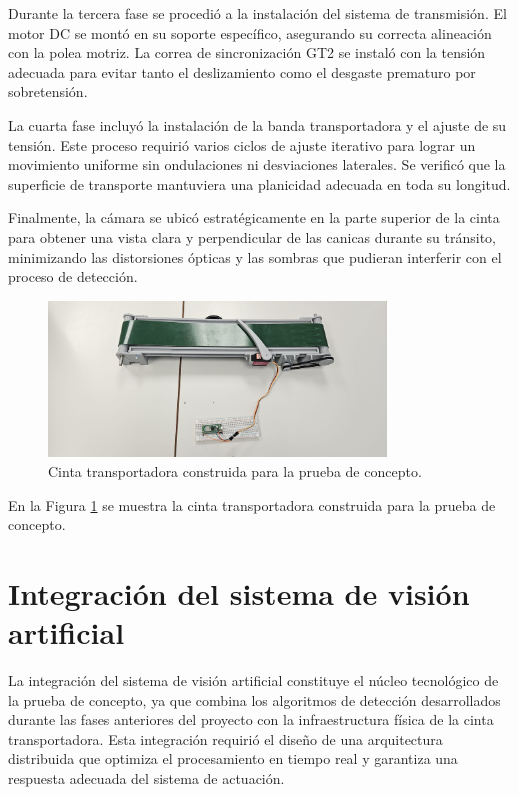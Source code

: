 \documentclass[11pt,spanish,listoffigures,listoftables]{tfgetsinf}
\begin{document}
Durante la tercera fase se procedió a la instalación del sistema de transmisión. El motor DC se montó en su soporte específico, asegurando su correcta alineación con la polea motriz. La correa de sincronización GT2 se instaló con la tensión adecuada para evitar tanto el deslizamiento como el desgaste prematuro por sobretensión.

La cuarta fase incluyó la instalación de la banda transportadora y el ajuste de su tensión. Este proceso requirió varios ciclos de ajuste iterativo para lograr un movimiento uniforme sin ondulaciones ni desviaciones laterales. Se verificó que la superficie de transporte mantuviera una planicidad adecuada en toda su longitud.

Finalmente, la cámara se ubicó estratégicamente en la parte superior de la cinta para obtener una vista clara y perpendicular de las canicas durante su tránsito, minimizando las distorsiones ópticas y las sombras que pudieran interferir con el proceso de detección.

\begin{figure}[H]
   \centering
   \includegraphics[width=0.8\textwidth]{images/prueba_de_concepto/cinta_transportadora_construccion.jpeg}
   \caption[Cinta transportadora construida para la prueba de concepto]{Cinta transportadora construida para la prueba de concepto.}
   \label{fig:cinta_transportadora}
\end{figure}

En la Figura \ref{fig:cinta_transportadora} se muestra la cinta transportadora construida para la prueba de concepto.

\section{Integración del sistema de visión artificial} \label{sec:integracion_vision}
La integración del sistema de visión artificial constituye el núcleo tecnológico de la prueba de concepto, ya que combina los algoritmos de detección desarrollados durante las fases anteriores del proyecto con la infraestructura física de la cinta transportadora. Esta integración requirió el diseño de una arquitectura distribuida que optimiza el procesamiento en tiempo real y garantiza una respuesta adecuada del sistema de actuación.
\end{document}
